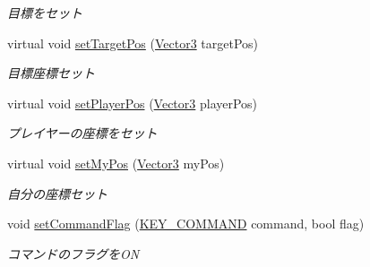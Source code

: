 \begin{DoxyCompactItemize}
\begin{DoxyCompactList}\small\item\em 目標をセット \end{DoxyCompactList}\item 
virtual void \hyperlink{class_key_base_a4f872eedccbf7570415a4fc7ce29a25c}{set\-Target\-Pos} (\hyperlink{struct_vector3}{Vector3} target\-Pos)
\begin{DoxyCompactList}\small\item\em 目標座標セット \end{DoxyCompactList}\item 
virtual void \hyperlink{class_key_base_a1c5b993006a01df1473faf79682c162a}{set\-Player\-Pos} (\hyperlink{struct_vector3}{Vector3} player\-Pos)
\begin{DoxyCompactList}\small\item\em プレイヤーの座標をセット \end{DoxyCompactList}\item 
virtual void \hyperlink{class_key_base_a6da652723fea6e06077c5370c01b5f01}{set\-My\-Pos} (\hyperlink{struct_vector3}{Vector3} my\-Pos)
\begin{DoxyCompactList}\small\item\em 自分の座標セット \end{DoxyCompactList}\item 
void \hyperlink{class_key_base_aa7ad9b3d6eb875fbf57d44b23cdef80a}{set\-Command\-Flag} (\hyperlink{class_key_base_a6e2d2326afadb1405879b31e4463e45f}{K\-E\-Y\-\_\-\-C\-O\-M\-M\-A\-N\-D} command, bool flag)
\begin{DoxyCompactList}\small\item\em コマンドのフラグを\-O\-N \end{DoxyCompactList}\end{DoxyCompactItemize}
